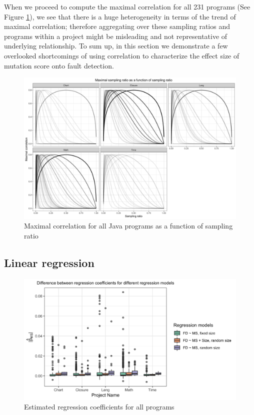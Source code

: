 \documentclass[10pt,letterpaper]{article}
\begin{document}
When we proceed to compute the maximal correlation for all 231 programs (See Figure \ref{fig:max_cor_all_231}), we see that there is a huge heterogeneity in terms of the trend of maximal correlation; therefore aggregating over these sampling ratios and programs within a project might be misleading and not representative of underlying relationship. To sum up, in this section we demonstrate a few overlooked shortcomings of using correlation to characterize the effect size of mutation score onto fault detection. 
    

  \begin{figure}[ht!]
        \centering
        \includegraphics[scale=0.07]{figures/maximal_correlation.png}
        \caption{Maximal correlation for all Java programs as a function of sampling ratio}
        \label{fig:max_cor_all_231}
    \end{figure}
    

\subsection{Linear regression}



  \begin{figure}[ht!]
        \centering
        \includegraphics[scale=0.15]{figures/beta_coef_size.png}
        \caption{Estimated regression coefficients for all programs}
        \label{fig:beta_coef_size}
    \end{figure}
    
\end{document}
